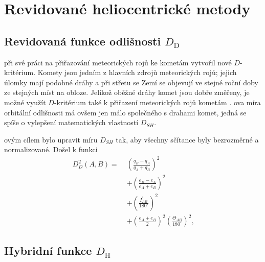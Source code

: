 \chapter{Revidované heliocentrické metody}%

\section{Revidovaná funkce odlišnosti $D_\text{D}$}%
\citeauthor{cometassoc} při své práci na přiřazování meteorických rojů ke kometám \cite{cometassoc} vytvořil nové $D$-kritérium. Komety jsou jedním z hlavních zdrojů meteorických rojů; jejich úlomky mají podobné dráhy a při střetu se Zemí se objevují ve stejné roční doby ze stejných míst na obloze. Jelikož oběžné dráhy komet jsou dobře změřeny, je možné využít $D$-kritérium také k přiřazení meteorických rojů kometám \cite{cometassoc}. \citeauthor{cometassoc}ova míra orbitální odlišnosti má ovšem jen málo společného s drahami komet, jedná se spíše o vylepšení matematických vlastností $D_{SH}$.

\citeauthor{cometassoc}ovým cílem bylo upravit míru $D_{SH}$ tak, aby všechny sčítance byly bezrozměrné a normalizované. Došel k funkci \cite{cometassoc}\cite{remarks}
\begin{equation}
    \begin{aligned}
        D_D^2(A,B)=\;&\left( \frac{q_B-q_A}{q_A+q_B} \right)^2\\
        &+\left( \frac{e_B-e_A}{e_A+e_B} \right)^2\\
        &+\left( \frac{I^\prime_{AB}}{180^\circ} \right)^2\\
        &+\left( \frac{e_A+e_B}{2} \right)^2\left( \frac{\Theta_{AB}}{180^\circ} \right)^2 \text{,}
    \end{aligned}
\end{equation}



\section{Hybridní funkce $D_\text{H}$}%
